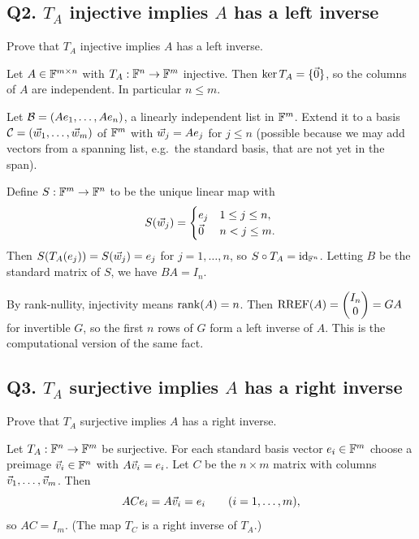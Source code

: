 \subsection{Q2. $T_A$ injective implies $A$ has a left inverse}

\begin{promptbox}
Prove that $T_A$ injective implies $A$ has a left inverse.
\end{promptbox}

\begin{coursebox}
Let $A\in\mathbb{F}^{m\times n}$ with $T_A:\mathbb{F}^n\to\mathbb{F}^m$ injective. Then
$\ker T_A=\{\vec{0}\}$, so the columns of $A$ are independent. In particular
$n\le m$.

Let $\mathcal{B}=(A e_1,\ldots,A e_n)$, a linearly independent list in $\mathbb{F}^m$. Extend it
to a basis $\mathcal{C}=(\vec{w}_1,\ldots,\vec{w}_m)$ of $\mathbb{F}^m$ with $\vec{w}_j=A e_j$ for
$j\le n$ (possible because we may add vectors from a spanning list, e.g.\ the
standard basis, that are not yet in the span).

Define $S:\mathbb{F}^m\to\mathbb{F}^n$ to be the unique linear map with
\[
S(\vec{w}_j)=\begin{cases}
e_j & 1\le j\le n,\\
\vec{0} & n<j\le m.
\end{cases}
\]
Then $S(T_A(e_j))=S(\vec{w}_j)=e_j$ for $j=1,\ldots,n$, so $S\circ T_A=\operatorname{id}_{\mathbb{F}^n}$.
Letting $B$ be the standard matrix of $S$, we have $BA=I_n$.
\end{coursebox}

\begin{laterbox}
By rank-nullity, injectivity means $\operatorname{rank}(A)=n$. Then $\operatorname{RREF}(A)=\begin{pmatrix}I_n\\0\end{pmatrix}=GA$
for invertible $G$, so the first $n$ rows of $G$ form a left inverse of $A$.
This is the computational version of the same fact.
\end{laterbox}

\subsection{Q3. $T_A$ surjective implies $A$ has a right inverse}

\begin{promptbox}
Prove that $T_A$ surjective implies $A$ has a right inverse.
\end{promptbox}

\begin{coursebox}
Let $T_A:\mathbb{F}^n\to\mathbb{F}^m$ be surjective. For each standard basis vector $e_i\in\mathbb{F}^m$
choose a preimage $\vec{v}_i\in\mathbb{F}^n$ with $A\vec{v}_i=e_i$. Let $C$ be the $n\times m$
matrix with columns $\vec{v}_1,\ldots,\vec{v}_m$. Then
\[
AC e_i=A\vec{v}_i=e_i\qquad(i=1,\ldots,m),
\]
so $AC=I_m$. (The map $T_C$ is a right inverse of $T_A$.)
\end{coursebox}

